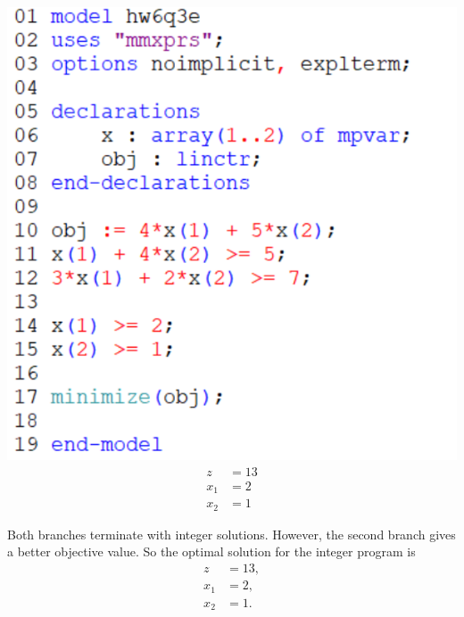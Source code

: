 \documentclass[12pt]{article}
\theoremstyle{definition}
\begin{document}
\begin{center}
\begin{minipage}{0.4\textwidth}
        \includegraphics[width=\textwidth]{code3e.png}
        \begin{align*}
            z &= 13 \\
            x_1 &= 2 \\
            x_2 &= 1
        \end{align*}
    \end{minipage}
\end{center}
Both branches terminate with integer solutions. However, the second branch gives a better objective value. So the optimal solution for the integer program is
\begin{align*}
    z &= 13, \\
    x_1 &= 2, \\
    x_2 &= 1.
\end{align*}
\end{document}
